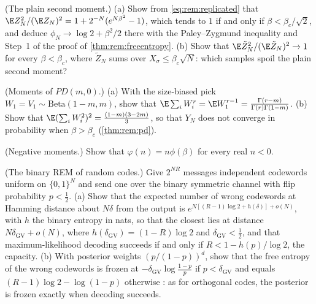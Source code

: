 \begin{refsection}
\begin{exercises}
\item \consolidation (The plain second moment.) (a) Show from \eqref{eq:rem:replicated} that $\E Z_N^2/(\E Z_N)^2=1+2^{-N}(e^{N\beta^2}-1)$, which tends to $1$ if and only if $\beta<\beta_c/\sqrt2$, and deduce $\phi_N\to\log2+\beta^2/2$ there with the Paley--Zygmund inequality and Step~1 of the proof of \cref{thm:rem:freeentropy}. (b) Show that $\E\tilde Z_N^2/(\E\tilde Z_N)^2\to1$ for every $\beta<\beta_c$, where $\tilde Z_N$ sums over $X_\sigma\le\beta_c\sqrt N$: which samples spoil the plain second moment? \label{ex:rem:secondmoment}

\item \consolidation (Moments of $PD(m,0)$.) (a) With the size-biased pick $W_1=V_1\sim\mathrm{Beta}(1-m,m)$, show that $\E\sum_iW_i^r=\E W_1^{r-1}=\frac{\Gamma(r-m)}{\Gamma(r)\Gamma(1-m)}$. (b) Show that $\E(\sum_iW_i^2)^2=\frac{(1-m)(3-2m)}3$, so that $Y_N$ does not converge in probability when $\beta>\beta_c$ (\cref{thm:rem:pd}). \label{ex:rem:pdmoments}

\item \consolidation (Negative moments.) Show that $\varphi(n)=n\phi(\beta)$ for every real $n<0$. \label{ex:rem:negative}

\item \byhand (The binary REM of random codes.) Give $2^{NR}$ messages independent codewords uniform on $\{0,1\}^N$ and send one over the binary symmetric channel with flip probability $p<\frac12$. (a) Show that the expected number of wrong codewords at Hamming distance about $N\delta$ from the output is $e^{N[(R-1)\log2+h(\delta)]+o(N)}$, with $h$ the binary entropy in nats, so that the closest lies at distance $N\delta_{\mathrm{GV}}+o(N)$, where $h(\delta_{\mathrm{GV}})=(1-R)\log2$ and $\delta_{\mathrm{GV}}<\frac12$, and that maximum-likelihood decoding succeeds if and only if $R<1-h(p)/\log2$, the capacity. (b) With posterior weights $(p/(1-p))^d$, show that the free entropy of the wrong codewords is frozen at $-\delta_{\mathrm{GV}}\log\frac{1-p}p$ if $p<\delta_{\mathrm{GV}}$ and equals $(R-1)\log2-\log(1-p)$ otherwise \parencite[ch.~6]{MezardMontanari2009}: as for orthogonal codes, the posterior is frozen exactly when decoding succeeds.\label{ex:rem:binary}


\end{exercises}
\end{refsection}
